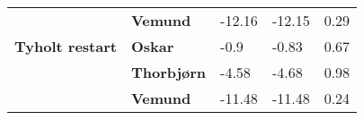 \begin{table}[]
\begin{tabular}{lllll}
                                        & \textbf{Vemund}                      & -12.16                            & -12.15                             & 0.29                                \\
\rowcolor[HTML]{C0C0C0} 
\textbf{Tyholt restart}                 & \textbf{Oskar}                       & -0.9                              & -0.83                              & 0.67                                \\
\rowcolor[HTML]{C0C0C0} 
                                        & \textbf{Thorbjørn}                   & -4.58                             & -4.68                              & 0.98                                \\
\rowcolor[HTML]{C0C0C0} 
                                        & \textbf{Vemund}                      & -11.48                            & -11.48                             & 0.24                               
\end{tabular}
\end{table}